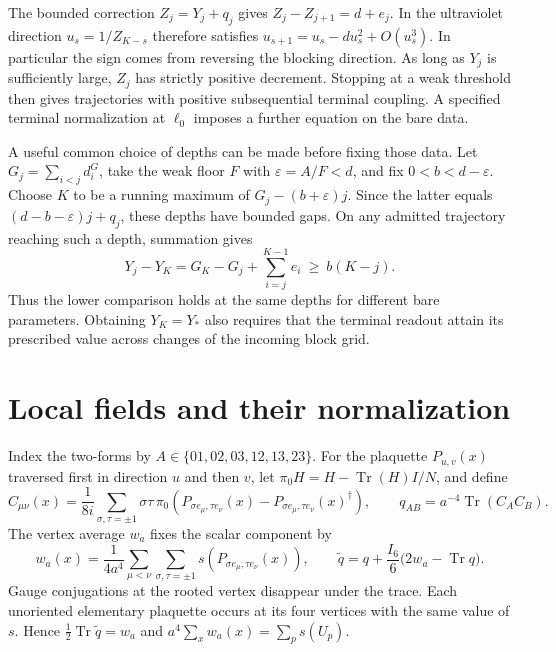 \documentclass[11pt,letterpaper]{article}
\begin{document}
The bounded correction \(Z_j=Y_j+q_j\) gives
\(Z_j-Z_{j+1}=d+e_j\). In the ultraviolet direction
\(u_s=1/Z_{K-s}\) therefore satisfies
\(u_{s+1}=u_s-du_s^2+O(u_s^3)\). In particular the sign comes from
reversing the blocking direction. As long as \(Y_j\) is sufficiently
large, \(Z_j\) has strictly positive decrement. Stopping at a weak
threshold then gives trajectories with positive subsequential terminal
coupling. A specified terminal normalization at \(\ell_0\) imposes a
further equation on the bare data.

A useful common choice of depths can be made before fixing those data.
Let \(G_j=\sum_{i<j}d_i^G\), take the weak floor \(F\) with
\(\varepsilon=A/F<d\), and fix \(0<b<d-\varepsilon\). Choose \(K\)
to be a running maximum of \(G_j-(b+\varepsilon)j\). Since the latter
equals \((d-b-\varepsilon)j+q_j\), these depths have bounded gaps.
On any admitted trajectory reaching such a depth, summation gives
\[
  Y_j-Y_K=G_K-G_j+\sum_{i=j}^{K-1}e_i\ \ge\ b(K-j).
\]
Thus the lower comparison holds at the same depths for different bare
parameters. Obtaining \(Y_K=Y_*\) also requires that the terminal
readout attain its prescribed value across changes of the incoming block grid.



\section{Local fields and their normalization}

Index the two-forms by \(A\in\{01,02,03,12,13,23\}\). For the plaquette
\(P_{u,v}(x)\) traversed first in direction \(u\) and then \(v\), let
\(\pi_0 H=H-\operatorname{Tr}(H)I/N\), and define
\[
 C_{\mu\nu}(x)=\frac{1}{8i}\sum_{\sigma,\tau=\pm1}\sigma\tau\,
   \pi_0\!\left(P_{\sigma e_\mu,\tau e_\nu}(x)
                 -P_{\sigma e_\mu,\tau e_\nu}(x)^\dagger\right),
 \qquad q_{AB}=a^{-4}\operatorname{Tr}(C_A C_B).
\]
The vertex average \(w_a\) fixes the scalar component by
\[
 w_a(x)=\frac{1}{4a^4}\sum_{\mu<\nu}\sum_{\sigma,\tau=\pm1}
            s(P_{\sigma e_\mu,\tau e_\nu}(x)),\qquad
 \widetilde q=q+\frac{I_6}{6}\big(2w_a-\operatorname{Tr}q\big).
\]
Gauge conjugations at the rooted vertex disappear under the trace.
Each unoriented elementary plaquette occurs at its four vertices with the
same value of \(s\). Hence
\(\tfrac12\operatorname{Tr}\widetilde q=w_a\) and
\(a^4\sum_xw_a(x)=\sum_p s(U_p)\).
\end{document}
